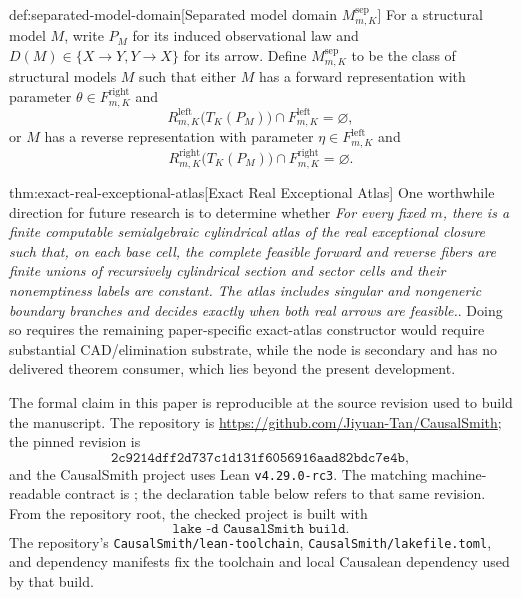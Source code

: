 \begin{definitionv}{def:separated-model-domain}[Separated model domain \(M^{\mathrm{sep}}_{m,K}\)]
For a structural model \(M\), write \(P_M\) for its induced observational law and \(D(M)\in\{X\to Y,Y\to X\}\) for its arrow. Define \(M^{\mathrm{sep}}_{m,K}\) to be the class of structural models \(M\) such that either \(M\) has a forward representation with parameter \(\theta\in F^{\mathrm{right}}_{m,K}\) and
\[
R^{\mathrm{left}}_{m,K}\bigl(T_K(P_M)\bigr)\cap F^{\mathrm{left}}_{m,K}=\varnothing,
\]
or \(M\) has a reverse representation with parameter \(\eta\in F^{\mathrm{left}}_{m,K}\) and
\[
R^{\mathrm{right}}_{m,K}\bigl(T_K(P_M)\bigr)\cap F^{\mathrm{right}}_{m,K}=\varnothing.
\]
\end{definitionv}

\begin{remarkv}{thm:exact-real-exceptional-atlas}[Exact Real Exceptional Atlas]
One worthwhile direction for future research is to determine whether \emph{For every fixed \(m\), there is a finite computable semialgebraic cylindrical atlas of the real exceptional closure such that, on each base cell, the complete feasible forward and reverse fibers are finite unions of recursively cylindrical section and sector cells and their nonemptiness labels are constant. The atlas includes singular and nongeneric boundary branches and decides exactly when both real arrows are feasible.}. Doing so requires the remaining paper-specific exact-atlas constructor would require substantial CAD/elimination substrate, while the node is secondary and has no delivered theorem consumer, which lies beyond the present development.
\end{remarkv}

The formal claim in this paper is reproducible at the source revision used to build the manuscript. The repository is \url{https://github.com/Jiyuan-Tan/CausalSmith}; the pinned revision is
\[
\texttt{2c9214dff2d737c1d131f6056916aad82bdc7e4b},
\]
and the CausalSmith project uses Lean \texttt{v4.29.0-rc3}. The matching
machine-readable contract is
;
the declaration table below refers to that same revision. From the repository
root, the checked project is built with
\[
\texttt{lake -d CausalSmith build}.
\]
The repository's \texttt{CausalSmith/lean-toolchain}, \texttt{CausalSmith/lakefile.toml}, and dependency manifests fix the toolchain and local Causalean dependency used by that build.

